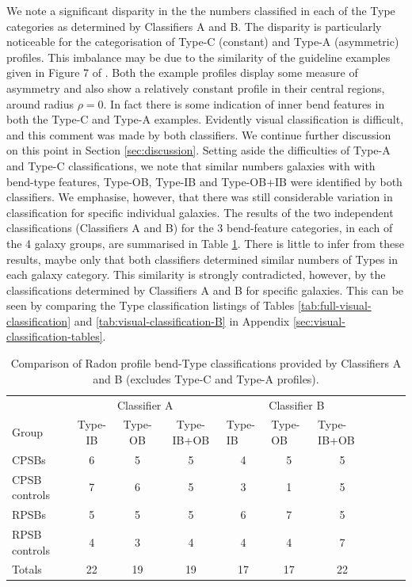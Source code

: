 We note a significant disparity in the the numbers classified in each of the Type categories as determined by Classifiers A and B. The disparity is particularly noticeable for the categorisation of Type-C (constant) and Type-A (asymmetric) profiles. This imbalance may be due to the similarity of the guideline examples given in Figure 7 of \cite{2018MNRAS.480.2217S}. Both the example profiles display some measure of asymmetry and also show a relatively constant profile in their central regions, around radius $\rho = 0$. In fact there is some indication of inner bend features in both the Type-C and Type-A examples. Evidently visual classification is difficult, and this comment was made by both classifiers. We continue further discussion on this point in Section \ref{sec:discussion}. Setting aside the difficulties of Type-A and Type-C classifications, we note that similar numbers galaxies with with bend-type features, Type-OB, Type-IB and Type-OB+IB were identified by both classifiers. We emphasise, however, that there was still considerable variation in classification for specific individual galaxies. The results of the two independent classifications (Classifiers A and B) for the 3 bend-feature categories, in each of the 4 galaxy groups, are summarised in Table \ref{tab:Radon-VC3-results}. There is little to infer from these results, maybe only that both classifiers determined similar numbers of Types in each galaxy category. This similarity is strongly contradicted, however, by the classifications determined by Classifiers A and B for specific galaxies. This can be seen by comparing the Type classification listings of Tables \ref{tab:full-visual-classification} and \ref{tab:visual-classification-B} in Appendix \ref{sec:visual-classification-tables}.

\begin{table}
\caption[Comparison of Radon profile classifications for bend-Type features by Classifiers A and B]{Comparison of Radon profile bend-Type classifications provided by Classifiers A and B (excludes Type-C and Type-A profiles).}
\label{tab:Radon-VC3-results}
\begin{tabular}{lccccccccc}
\hline
 & \multicolumn{3}{c}{Classifier A} & \multicolumn{3}{c}{Classifier B} \\ 
Group & Type-IB & Type-OB & Type-IB+OB & \multicolumn{1}{l}{Type-IB} & \multicolumn{1}{l}{Type-OB} & \multicolumn{1}{l}{Type-IB+OB} \\
\hline
CPSBs & 6 & 5 & 5 & 4 & 5 & 5 \\
CPSB controls & 7 & 6 & 5 & 3 & 1 & 5 \\
RPSBs & 5 & 5 & 5 & 6 & 7 & 5 \\
RPSB controls & 4 & 3 & 4 & 4 & 4 & 7 \\
\hline
Totals & 22 & 19 & 19 & 17 & 17 & 22 \\
\hline
\end{tabular}
\end{table}

